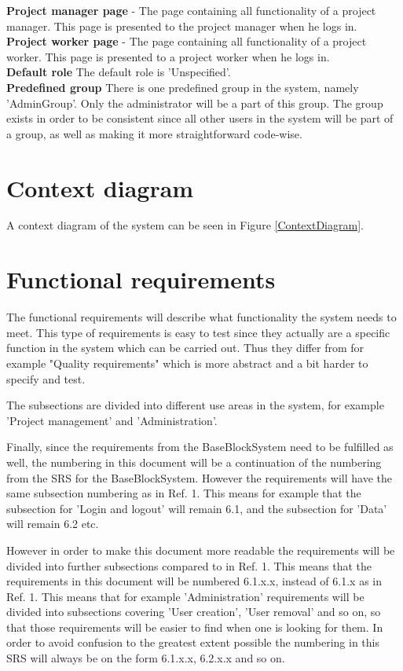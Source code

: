 \documentclass{article}
\begin{document}
\textbf{Project manager page} - The page containing all functionality of a project manager. This page is presented to the project manager when he logs in.\\
\textbf{Project worker page} - The page containing all functionality of a project worker. This page is presented to a project worker when he logs in.\\
\textbf{Default role} The default role is 'Unspecified'. \\
\textbf{Predefined group} There is one predefined group in the system, namely 'AdminGroup'. Only the administrator will be a part of this group. The group exists in order to be consistent since all other users in the system will be part of a group, as well as making it more straightforward code-wise. 

\section{Context diagram}

A context diagram of the system can be seen in Figure \ref{ContextDiagram}.

\section{Functional requirements}

The functional requirements will describe what functionality the system needs to meet. This type of requirements is easy to test since they actually are a specific function in the system which can be carried out. Thus they differ from for example "Quality requirements" which is more abstract and a bit harder to specify and test. 

The subsections are divided into different use areas in the system, for example 'Project management' and 'Administration'. 

Finally, since the requirements from the BaseBlockSystem need to be fulfilled as well, the numbering in this document will be a continuation of the numbering from the SRS for the BaseBlockSystem. However the requirements will have the same subsection numbering as in Ref. 1. This means for example that the subsection for 'Login and logout' will remain 6.1, and the subsection for 'Data' will remain 6.2 etc. 

However in order to make this document more readable the requirements will be divided into further subsections compared to in Ref. 1. This means that the requirements in this document will be numbered 6.1.x.x, instead of 6.1.x as in Ref. 1. This means that for example 'Administration' requirements will be divided into subsections covering 'User creation', 'User removal' and so on, so that those requirements will be easier to find when one is looking for them. In order to avoid confusion to the greatest extent possible the numbering in this SRS will always be on the form 6.1.x.x, 6.2.x.x and so on. \\ \\
\end{document}
